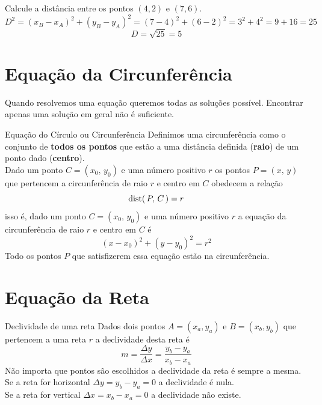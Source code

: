 \begin{exemplos}
    \begin{exemplo}
        Calcule a distância entre os pontos $(4,2)$ e $(7,6)$.
        \[ D^2  = (x_B-x_A)^2 + (y_B-y_A)^2 = (7-4)^2 + (6-2)^2 = 3^2 + 4^2 = 9 + 16 = 25 \]
        \[ D    = \sqrt{25} = 5 \]    
    \end{exemplo}
\end{exemplos}

\section{Equação da Circunferência}

\begin{observacao}
    Quando resolvemos uma equação queremos todas as soluções possível. Encontrar apenas uma solução em geral não é suficiente.
\end{observacao}

\begin{teoria}{Equação do Círculo ou Circunferência}
    Definimos uma circunferência como o conjunto de \textbf{todos os pontos} que estão a uma distância definida (\textbf{raio}) de um ponto dado (\textbf{centro}).
    \\
    
    Dado um ponto $C=(x_0,\,y_0)$ e uma número positivo $r$ os pontos $P=(x,\,y)$ que pertencem a circunferência de raio $r$ e centro em $C$ obedecem a relação
    \[ \operatorname{dist}(\,P,\,C\,) = r \]
    isso é, dado um ponto $C=(x_0,\,y_0)$ e uma número positivo $r$ a equação da circunferência de raio $r$ e centro em $C$ é
    \[ (x-x_0)^2 + (y-y_0)^2  = r^2 \]
    Todo os pontos $P$ que satisfizerem essa equação estão na circunferência. 
\end{teoria}

\section{Equação da Reta}

\begin{teoria}{Declividade de uma reta}
    Dados dois pontos $A=(x_a,y_a)$ e $B=(x_b,y_b)$ que pertencem a uma reta $r$ a declividade desta reta é
    \[ m = \frac{\Delta y}{\Delta x} = \frac{y_b-y_a}{x_b-x_a} \]
    Não importa que pontos são escolhidos a declividade da reta é sempre a mesma.
    \\
    
    Se a reta for horizontal \tabto{38mm} $\Delta y = y_b-y_a = 0$ \tabto{69mm} a declividade é nula. \\
    Se a reta for vertical   \tabto{38mm} $\Delta x = x_b-x_a = 0$ \tabto{69mm} a declividade não existe. 
    
\end{teoria}

